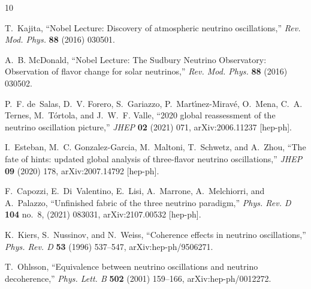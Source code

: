\documentclass[aps, prd, onecolumn, tightenlines, notitlepage, superscriptaddress, nofootinbib, preprintnumbers, floatfix,showkeys,11pt]{revtex4-2}
\begin{document}
\providecommand{\href}[2]{#2}\begingroup\raggedright\begin{thebibliography}{10}

T.~Kajita, ``{Nobel Lecture: Discovery of atmospheric neutrino oscillations},''
  \href{http://dx.doi.org/10.1103/RevModPhys.88.030501}{{\em Rev. Mod. Phys.}
  {\bfseries 88} (2016) 030501}.

A.~B. McDonald, ``{Nobel Lecture: The Sudbury Neutrino Observatory: Observation
  of flavor change for solar neutrinos},''
  \href{http://dx.doi.org/10.1103/RevModPhys.88.030502}{{\em Rev. Mod. Phys.}
  {\bfseries 88} (2016) 030502}.

P.~F. de~Salas, D.~V. Forero, S.~Gariazzo, P.~Mart\'\i{}nez-Mirav\'e, O.~Mena,
  C.~A. Ternes, M.~T\'ortola, and J.~W.~F. Valle, ``{2020 global reassessment
  of the neutrino oscillation picture},''
  \href{http://dx.doi.org/10.1007/JHEP02(2021)071}{{\em JHEP} {\bfseries 02}
  (2021) 071}, \href{http://arxiv.org/abs/2006.11237}{{\ttfamily
  arXiv:2006.11237 [hep-ph]}}.

I.~Esteban, M.~C. Gonzalez-Garcia, M.~Maltoni, T.~Schwetz, and A.~Zhou, ``{The
  fate of hints: updated global analysis of three-flavor neutrino
  oscillations},'' \href{http://dx.doi.org/10.1007/JHEP09(2020)178}{{\em JHEP}
  {\bfseries 09} (2020) 178}, \href{http://arxiv.org/abs/2007.14792}{{\ttfamily
  arXiv:2007.14792 [hep-ph]}}.

F.~Capozzi, E.~Di~Valentino, E.~Lisi, A.~Marrone, A.~Melchiorri, and
  A.~Palazzo, ``{Unfinished fabric of the three neutrino paradigm},''
  \href{http://dx.doi.org/10.1103/PhysRevD.104.083031}{{\em Phys. Rev. D}
  {\bfseries 104} no.~8, (2021) 083031},
  \href{http://arxiv.org/abs/2107.00532}{{\ttfamily arXiv:2107.00532
  [hep-ph]}}.

K.~Kiers, S.~Nussinov, and N.~Weiss, ``{Coherence effects in neutrino
  oscillations},'' \href{http://dx.doi.org/10.1103/PhysRevD.53.537}{{\em Phys.
  Rev. D} {\bfseries 53} (1996) 537--547},
  \href{http://arxiv.org/abs/hep-ph/9506271}{{\ttfamily arXiv:hep-ph/9506271}}.

T.~Ohlsson, ``{Equivalence between neutrino oscillations and neutrino
  decoherence},'' \href{http://dx.doi.org/10.1016/S0370-2693(01)00178-2}{{\em
  Phys. Lett. B} {\bfseries 502} (2001) 159--166},
  \href{http://arxiv.org/abs/hep-ph/0012272}{{\ttfamily arXiv:hep-ph/0012272}}.


\end{thebibliography}
\end{document}
